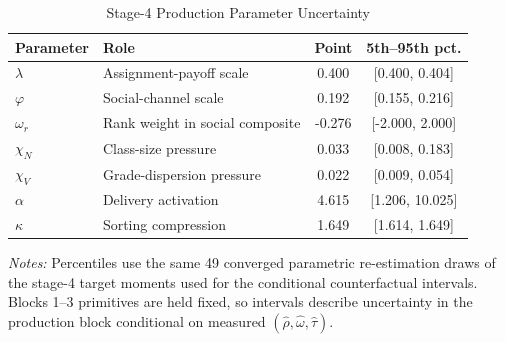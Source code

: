 \begin{table}[H]
\centering
\caption{Stage-4 Production Parameter Uncertainty}
\label{tab:struct_stage4_param_uncertainty}
\begin{threeparttable}
\begin{tabular}[t]{llcc}
\toprule
Parameter & Role & Point & 5th--95th pct. \\
\midrule
$\lambda$ & Assignment-payoff scale & 0.400 & [0.400, 0.404] \\
$\varphi$ & Social-channel scale & 0.192 & [0.155, 0.216] \\
$\omega_r$ & Rank weight in social composite & -0.276 & [-2.000, 2.000] \\
$\chi_N$ & Class-size pressure & 0.033 & [0.008, 0.183] \\
$\chi_V$ & Grade-dispersion pressure & 0.022 & [0.009, 0.054] \\
$\alpha$ & Delivery activation & 4.615 & [1.206, 10.025] \\
$\kappa$ & Sorting compression & 1.649 & [1.614, 1.649] \\
\bottomrule
\end{tabular}
\begin{tablenotes}
\footnotesize
\item \textit{Notes:} Percentiles use the same 49 converged parametric re-estimation draws of the stage-4 target moments used for the conditional counterfactual intervals. Blocks 1--3 primitives are held fixed, so intervals describe uncertainty in the production block conditional on measured $(\hat{\rho},\hat{\omega},\hat{\tau})$.
\end{tablenotes}
\end{threeparttable}
\end{table}
